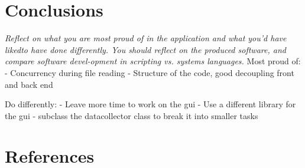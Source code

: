 \documentclass[11pt]{article}
\begin{document}
\section{Conclusions}
\emph{Reflect on what you are most proud of in the application and what you’d have likedto have done differently.  You should reflect on the produced software, and compare software devel-opment in scripting vs.  systems languages.}
Most proud of:
- Concurrency during file reading
- Structure of the code, good decoupling front and back end

Do differently:
- Leave more time to work on the gui
- Use a different library for the gui
- subclass the datacollector class to break it into smaller tasks


\pagebreak
\appendix
\section{References}
\printbibliography
\end{document}
